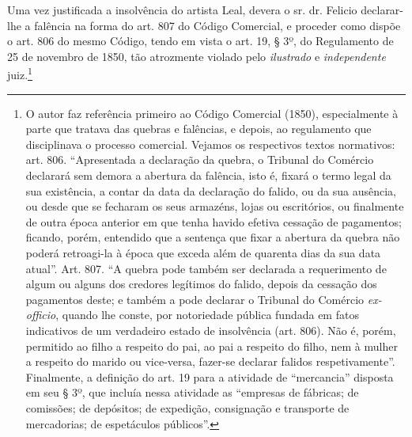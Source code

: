 Uma vez justificada a insolvência do artista Leal, devera o sr. dr.
Felicio declarar-lhe a falência na forma do art. 807 do Código
Comercial, e proceder como dispõe o art. 806 do mesmo Código, tendo em
vista o art. 19, § 3º, do Regulamento de 25 de novembro de 1850, tão
atrozmente violado pelo \emph{ilustrado} e \emph{independente}
juiz.\footnote{ O autor faz referência primeiro ao Código Comercial
  (1850), especialmente à parte que tratava das quebras e falências, e
  depois, ao regulamento que disciplinava o processo comercial. Vejamos
  os respectivos textos normativos: art. 806. ``Apresentada a declaração
  da quebra, o Tribunal do Comércio declarará sem demora a abertura da
  falência, isto é, fixará o termo legal da sua existência, a contar da
  data da declaração do falido, ou da sua ausência, ou desde que se
  fecharam os seus armazéns, lojas ou escritórios, ou finalmente de
  outra época anterior em que tenha havido efetiva cessação de
  pagamentos; ficando, porém, entendido que a sentença que fixar a
  abertura da quebra não poderá retroagi-la à época que exceda além de
  quarenta dias da sua data atual''. Art. 807. ``A quebra pode também ser
  declarada a requerimento de algum ou alguns dos credores legítimos do
  falido, depois da cessação dos pagamentos deste; e também a pode
  declarar o Tribunal do Comércio \emph{ex-officio}, quando lhe conste,
  por notoriedade pública fundada em fatos indicativos de um verdadeiro
  estado de insolvência (art. 806). Não é, porém, permitido ao filho a
  respeito do pai, ao pai a respeito do filho, nem à mulher a respeito
  do marido ou vice-versa, fazer-se declarar falidos respetivamente''.
  Finalmente, a definição do art. 19 para a atividade de ``mercancia''
  disposta em seu § 3º, que incluía nessa atividade as ``empresas de
  fábricas; de comissões; de depósitos; de expedição, consignação e
  transporte de mercadorias; de espetáculos públicos''.}

